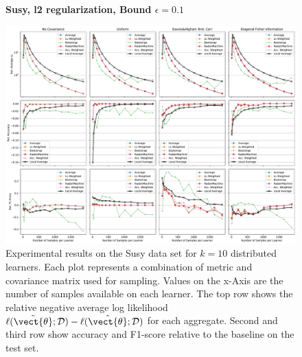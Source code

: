     \begin{landscape}
        \begin{figure}
            \centering
            \textbf{Susy, l2 regularization, Bound $\epsilon=0.1$}\par\medskip
            \includegraphics[height=\dimexpr \textheight - 4\baselineskip\relax]{kapitel/figures/susy_l2_0.1_neg_relative.pdf}
            \caption[Susy plots with l2 regularization and $\epsilon=0.1$]{Experimental results on the Susy data set for $k=10$ distributed learners. Each plot represents a combination of metric and covariance matrix used for sampling. Values on the x-Axis are the number of samples available on each learner. The top row shows the relative negative average log likelihood $\ell(\tilde{\vect{\theta}}; \mathcal{D}) - \ell(\hat{\vect{\theta}}; \mathcal{D})$ for each aggregate. Second and third row show accuracy and F1-score relative to the baseline on the test set.}
            \label{fig:analysis6}
        \end{figure}
    \end{landscape}

